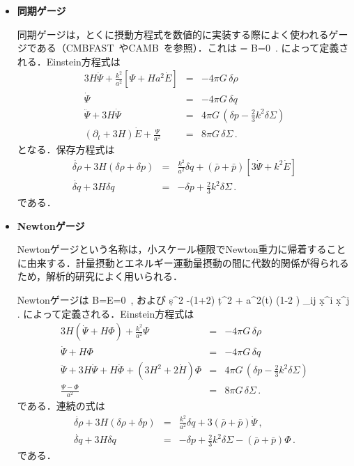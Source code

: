 \begin{itemize}
\item {\bf 同期ゲージ}



同期ゲージは，とくに摂動方程式を数値的に実装する際によく使われるゲージである（{\sf CMBFAST}~\cite{CMBFAST}や{\sf CAMB}~\cite{CAMB}を参照）．これは
\beq
\Phi = B=0\, .
\eeq
によって定義される．Einstein方程式は
\begin{eqnarray}
3H \dot \Psi + \frac{k^2}{a^2} \left[ \Psi + H a^2 \dot E\right] &=& - 4\pi G \, \delta \rho \\
\dot \Psi &=& - 4\pi G \, \delta q \\
\ddot \Psi + 3 H \dot \Psi &=& 4 \pi G\, \left( \delta p - \frac{2}{3} k^2 \delta \Sigma \right) \\
(\partial_t + 3 H) \dot E  + \frac{\Psi }{a^2}&=& 8 \pi G\, \delta \Sigma\, .
\end{eqnarray}
となる．保存方程式は
\begin{eqnarray}
\label{equ:con:source-duplicate-1}
\dot{\delta \rho} + 3 H (\delta \rho + \delta p) &=& \frac{k^2}{a^2} \delta q + (\bar \rho + \bar p) [3 \dot \Psi + k^2 \dot E ] \\
\dot{\delta q} + 3 H \delta q &=& - \delta p + \frac{2}{3} k^2 \delta \Sigma \, .
\end{eqnarray}
である．



\item {\bf Newtonゲージ}



Newtonゲージという名称は，小スケール極限でNewton重力に帰着することに由来する．計量摂動とエネルギー運動量摂動の間に代数的関係が得られるため，解析的研究によく用いられる．



Newtonゲージは
\beq
B=E=0\, ,
\eeq
および
\beq
\d s^2 -(1+2\Phi) \d t^2 + a^2(t) (1-2 \Psi) \delta_{ij} \d x^i \d x^j\, .
\eeq
によって定義される．Einstein方程式は
\begin{eqnarray}
3H(\dot \Psi + H \Phi) + \frac{k^2}{a^2}  \Psi &=& - 4\pi G \, \delta \rho \\
\dot \Psi + H \Phi &=& - 4\pi G \, \delta q\\
\ddot \Psi + 3 H \dot \Psi + H \dot \Phi + (3 H^2 + 2 \dot H) \Phi &=& 4 \pi G\, \left( \delta p - \frac{2}{3} k^2 \delta \Sigma \right) \\
\frac{\Psi - \Phi}{a^2}&=& 8 \pi G\, \delta \Sigma\, .
\end{eqnarray}
である．連続の式は
\begin{eqnarray}
\label{equ:con:source-duplicate-2}
\dot{\delta \rho} + 3 H (\delta \rho + \delta p) &=& \frac{k^2}{a^2} \delta q + 3 (\bar \rho + \bar p)  \dot \Psi \, ,\\
\dot{\delta q} + 3 H \delta q &=& - \delta p + \frac{2}{3} k^2 \delta \Sigma - (\bar \rho + \bar p) \Phi\, .
\end{eqnarray}
である．




\end{itemize}
